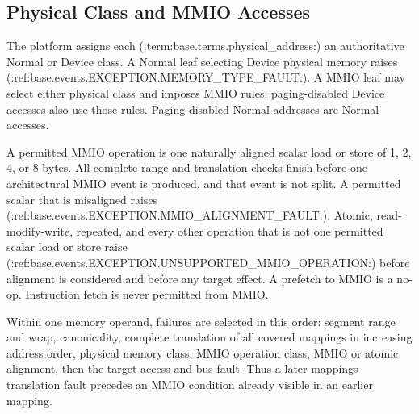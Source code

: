 \subsection{Physical Class and MMIO Accesses}
The platform assigns each (:term:base.terms.physical_address:) an authoritative Normal or Device
class. A Normal leaf selecting Device physical memory raises
(:ref:base.events.EXCEPTION.MEMORY_TYPE_FAULT:). A MMIO leaf may select either physical
class and imposes MMIO rules; paging-disabled Device accesses also use those
rules. Paging-disabled Normal addresses are Normal accesses.

A permitted MMIO operation is one naturally aligned scalar load or store of
1, 2, 4, or 8 bytes. All complete-range and translation checks finish before
one architectural MMIO event is produced, and that event is not split. A
permitted scalar that is misaligned raises
(:ref:base.events.EXCEPTION.MMIO_ALIGNMENT_FAULT:). Atomic, read-modify-write, repeated, and every other operation that
is not one permitted scalar load or store raise
(:ref:base.events.EXCEPTION.UNSUPPORTED_MMIO_OPERATION:) before alignment is considered and
before any target effect. A prefetch to MMIO is a no-op. Instruction fetch is
never permitted from MMIO.

Within one memory operand, failures are selected in this order: segment range
and wrap, canonicality, complete translation of all covered mappings in
increasing address order, physical memory class, MMIO operation class, MMIO or
atomic alignment, then the target access and bus fault. Thus a later mapping\textquotesingle{}s
translation fault precedes an MMIO condition already visible in an earlier
mapping.
